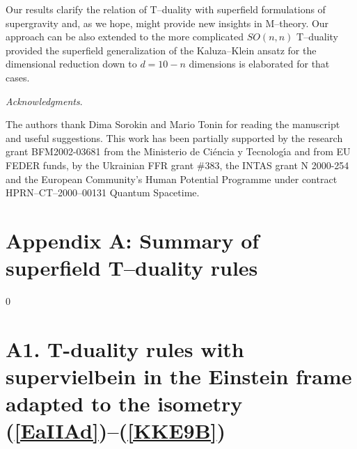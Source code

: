 \documentclass[a4paper,11pt]{article}
\begin{document}
Our results  clarify the relation of T--duality with superfield 
formulations of supergravity and, as  we hope, might provide new 
insights in M--theory. 
Our approach  can be also extended to 
the more complicated  $SO(n,n)$ T--duality provided 
the superfield generalization 
of the Kaluza--Klein ansatz for the dimensional reduction 
down to $d=10-n$ dimensions is elaborated for that cases. 
  




\bigskip 


{\it Acknowledgments}. 

The authors thank Dima Sorokin and Mario Tonin for reading the manuscript 
and useful suggestions. 
This work has been partially supported by the research grant BFM2002-03681 
from the Ministerio de Ci\'encia y Tecnolog\'{\i}a and
from EU FEDER funds, 
by the Ukrainian FFR grant 
$\# 383$,  the INTAS grant N 2000-254 and the European Community's 
Human Potential Programme under contract HPRN--CT--2000--00131 Quantum 
Spacetime.  


\bigskip 


\newpage 

\section*{Appendix A: Summary of superfield  T--duality rules} 
\renewcommand{\theequation}{A.\arabic{equation}} 
\setcounter{equation}0

\section*{A1. T-duality rules with supervielbein in the Einstein frame 
adapted to the isometry (\ref{EaIIAd})--(\ref{KKE9B})}
\end{document}
